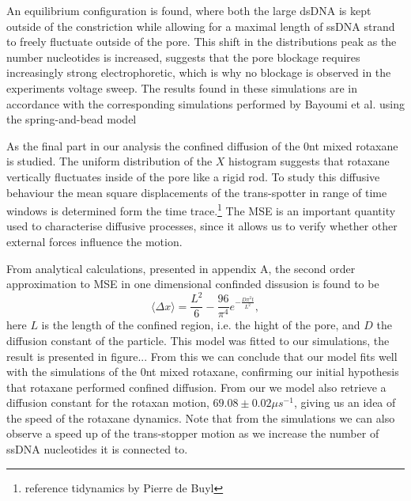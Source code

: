 An equilibrium configuration is found, where both the large
dsDNA is kept outside of the constriction while allowing for a maximal length of ssDNA
strand to freely fluctuate outside of the pore. This shift in the distributions peak as
the number nucleotides is increased, suggests that the pore blockage requires
increasingly strong electrophoretic, which is why no blockage is observed in the
experiments voltage sweep. The results found in these simulations are in accordance with
the corresponding simulations performed by Bayoumi et al. using the spring-and-bead model

As the final part in our analysis the confined diffusion of the 0nt mixed rotaxane is
studied. The uniform distribution of the $X$ histogram suggests that rotaxane vertically
fluctuates inside of the pore like a rigid rod. To study this diffusive behaviour the
mean square displacements of the trans-spotter in range of time windows is determined
form the time trace.\footnote{reference tidynamics by Pierre de Buyl} The MSE is an
important quantity used to characterise diffusive processes, since it allows us to verify
whether other external forces influence the motion.


From analytical
calculations, presented in appendix A, the second order approximation to MSE in one
dimensional confinded dissusion is found to be
\begin{equation*}
\langle \Delta x \rangle = \frac{L^2}{6} - \frac{96}{\pi^4} e^{-\frac{D \pi^2t
}{L^2}},
\end{equation*}
here $L$ is the length of the confined region, i.e. the hight of the pore, and $D$ the
diffusion constant of the particle. This model was fitted to our simulations, the result
is presented in figure... From this we can conclude that our model fits well with the
simulations of the 0nt mixed rotaxane, confirming our initial hypothesis that rotaxane
performed confined diffusion. From our we model also retrieve a diffusion constant for
the rotaxan motion, $69.08 \pm 0.02 \mu s^{-1}$, giving us an idea of the speed of the
rotaxane dynamics. Note that from the simulations we can also observe a speed up of the
trans-stopper motion as we increase the number of ssDNA nucleotides it is connected to.



